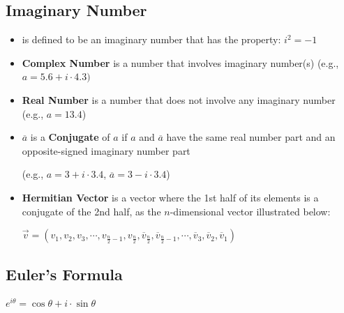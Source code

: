 \subsection{Imaginary Number}
\label{subsec:imaginary}


\begin{tcolorbox}[title={\textbf{\tboxdef{\ref*{subsec:imaginary}} Imaginary Number}}]

\begin{itemize}

\item {} is defined to be an imaginary number that has the property: $i^2 =-1$
\item \textbf{Complex Number} is a number that involves imaginary number(s) (e.g., $a = 5.6 + i\cdot4.3)$

\item \textbf{Real Number} is a number that does not involve any imaginary number (e.g., $a = 13.4$)

\item $\overline{a}$ is a \textbf{Conjugate} of $a$ if $a$ and $\overline{a}$ have the same real number part and an opposite-signed imaginary number part

(e.g., $a = 3 + i\cdot3.4$, \text{ } $\overline{a} = 3 - i\cdot3.4$)

\item \textbf{Hermitian Vector} is a vector where the 1st half of its elements is a conjugate of the 2nd half, as the $n$-dimensional vector illustrated below:

$\vec{v} = (v_1, v_2, v_3, \cdots, v_{\frac{n}{2}-1}, v_{\frac{n}{2}}, \overline{v}_{\frac{n}{2}}, \overline{v}_{\frac{n}{2} - 1}, \cdots, \overline{v}_3, \overline{v}_2, \overline{v}_1)$


\end{itemize}
\end{tcolorbox}



\subsection{Euler's Formula}
\label{subsec:euler}




\begin{tcolorbox}[title={\textbf{\tboxdef{\ref*{subsec:euler}} Euler's Formula}}]

$e^{i\theta} = \cos\theta + i\cdot\sin\theta$

\end{tcolorbox}

